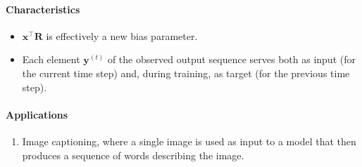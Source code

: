 \documentclass[12pt, a4paper]{article}
\def\vx{\boldsymbol{x}}
\def\vR{\boldsymbol{R}}
\newcommand{\egvy}[1]{\boldsymbol{y}^{(#1)}}
\begin{document}
\paragraph{Characteristics}
\begin{itemize}
    \item $\vx^\top \vR$ is effectively a new bias parameter.
    \item Each element $\egvy{t}$ of the observed output sequence serves both as input (for the current time step) and, during training, as target (for the previous time step).
\end{itemize}
\paragraph{Applications}
\begin{enumerate}
    \item Image captioning, where a single image is used as input to a model that then produces a sequence of words describing the image.
\end{enumerate}
\end{document}
